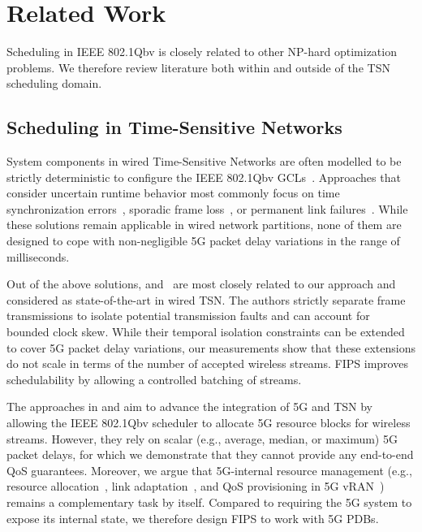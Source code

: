 \section{Related Work} \label{sec:related_work}
Scheduling in IEEE 802.1Qbv is closely related to other NP-hard optimization problems.
We therefore review literature both within and outside of the TSN scheduling domain.

\subsection{Scheduling in Time-Sensitive Networks}
System components in wired Time-Sensitive Networks are often modelled to be strictly deterministic to configure the IEEE 802.1Qbv GCLs~\cite{nwps,10228875,10.1145/3139258.3139289,8894249}.
Approaches that consider uncertain runtime behavior most commonly focus on time synchronization errors~\cite{10228980,10144237,Craciunas2016RTNS}, sporadic frame loss~\cite{Craciunas2016RTNS,10.1145/3458768,FENG2022102381,9488750}, or permanent link failures~\cite{9488750,8607244,8474201,reusch2022dependability}.
While these solutions remain applicable in wired network partitions, none of them are designed to cope with non-negligible 5G packet delay variations in the range of milliseconds.

Out of the above solutions, \cite{nwps} and~\cite{Craciunas2016RTNS} are most closely related to our approach and considered as state-of-the-art in wired TSN.
The authors strictly separate frame transmissions to isolate potential transmission faults and can account for bounded clock skew.
While their temporal isolation constraints can be extended to cover 5G packet delay variations, our measurements show that these extensions do not scale in terms of the number of accepted wireless streams.
FIPS improves schedulability by allowing a controlled batching of streams.

The approaches in \cite{9212049} and \cite{9940254} aim to advance the integration of 5G and TSN by allowing the IEEE 802.1Qbv scheduler to allocate 5G resource blocks for wireless streams.
However, they rely on scalar (e.g., average, median, or maximum) 5G packet delays, for which we demonstrate that they cannot provide any end-to-end QoS guarantees. 
Moreover, we argue that 5G-internal resource management (e.g., resource allocation~\cite{8736403}, link adaptation~\cite{9488790}, and QoS provisioning in 5G vRAN~\cite{infocom24_5gvran}) remains a complementary task by itself.
Compared to requiring the 5G system to expose its internal state, we therefore design FIPS to work with 5G PDBs.

